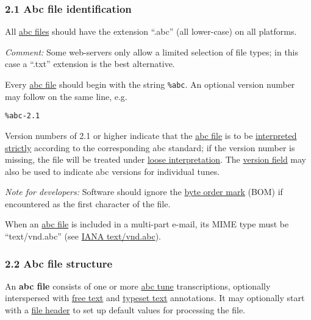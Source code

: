 \hypertarget{abc_file_identification}{\subsubsection{2.1 Abc file
identification}\label{abc_file_identification}}

All \protect\hyperlink{abc_file_definition}{abc files} should have the
extension ``.abc'' (all lower-case) on all platforms.

\emph{Comment:} Some web-servers only allow a limited selection of file
types; in this case a ``.txt'' extension is the best alternative.

Every \protect\hyperlink{abc_file_definition}{abc file} should begin
with the string \texttt{\%abc}. An optional version number may follow on
the same line, e.g.

\begin{verbatim}
%abc-2.1
\end{verbatim}

Version numbers of 2.1 or higher indicate that the
\protect\hyperlink{abc_file_definition}{abc file} is to be
\protect\hyperlink{strict_interpretation}{interpreted strictly}
according to the corresponding abc standard; if the version number is
missing, the file will be treated under
\protect\hyperlink{loose_interpretation}{loose interpretation}. The
\protect\hyperlink{version_field}{version field} may also be used to
indicate abc versions for individual tunes.

\emph{Note for developers:} Software should ignore the
\href{http://en.wikipedia.org/wiki/Byte_order_mark}{byte order mark}
(BOM) if encountered as the first character of the file.

When an \protect\hyperlink{abc_file_definition}{abc file} is included in
a multi-part e-mail, its MIME type must be ``text/vnd.abc'' (see
\href{http://www.iana.org/assignments/media-types/text/vnd.abc}{IANA
text/vnd.abc}).

\hypertarget{abc_file_structure}{\subsubsection{2.2 Abc file
structure}\label{abc_file_structure}}

\href{}{}An \textbf{abc file} consists of one or more
\protect\hyperlink{abc_tune_definition}{abc tune} transcriptions,
optionally interspersed with
\protect\hyperlink{free_text_definition}{free text} and
\protect\hyperlink{typeset_text_definition}{typeset text} annotations.
It may optionally start with a
\protect\hyperlink{file_header_definition}{file header} to set up
default values for processing the file.

